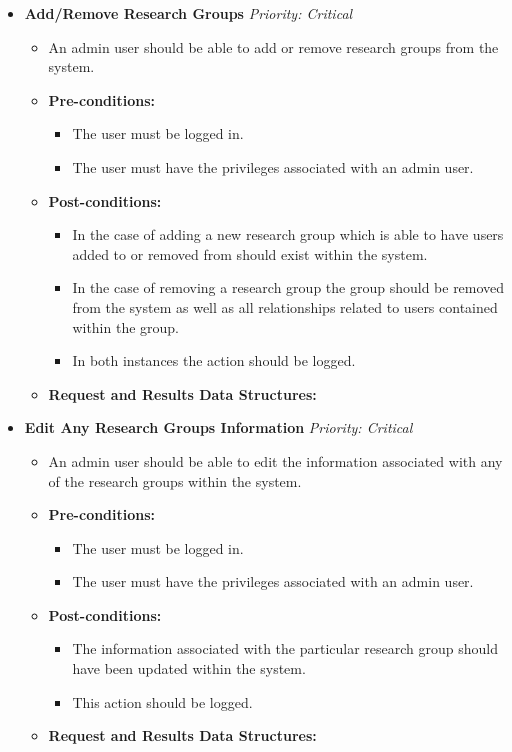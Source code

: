\documentclass{article}
\begin{document}
				\begin{itemize}
					\item \textbf{Add/Remove Research Groups} \hfill \textit{Priority: Critical}
					\begin{itemize}
						\item An admin user should be able to add or remove research groups from the system.
						\item \textbf{Pre-conditions:}
						\begin{itemize}
							\item The user must be logged in.
							\item The user must have the privileges associated with an admin user.
						\end{itemize}
						\item \textbf{Post-conditions:}
						\begin{itemize}
							\item In the case of adding a new research group which is able to have users added to or removed from should exist within the system.
							\item In the case of removing a research group the group should be removed from the system as well as all relationships related to users contained within the group.
							\item In both instances the action should be logged.
						\end{itemize}
						\item \textbf{Request and Results Data Structures:}
					\end{itemize}

					\item \textbf{Edit Any Research Groups Information} \hfill \textit{Priority: Critical}
					\begin{itemize}
						\item An admin user should be able to edit the information associated with any of the research groups within the system.
						\item \textbf{Pre-conditions:}
						\begin{itemize}
							\item The user must be logged in.
							\item The user must have the privileges associated with an admin user.
						\end{itemize}
						\item \textbf{Post-conditions:}
						\begin{itemize}
							\item The information associated with the particular research group should have been updated within the system.
							\item This action should be logged.
						\end{itemize}
						\item \textbf{Request and Results Data Structures:}
					\end{itemize}


\end{itemize}
\end{document}
